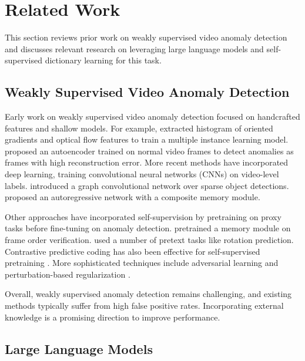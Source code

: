 \section{Related Work}
\label{sec:relate}

%
This section reviews prior work on weakly supervised video anomaly detection and discusses relevant research on leveraging large language models and self-supervised dictionary learning for this task.

\subsection{Weakly Supervised Video Anomaly Detection}

Early work on weakly supervised video anomaly detection focused on handcrafted features and shallow models. For example, \citet{a-lu2013abnormal} extracted histogram of oriented gradients and optical flow features to train a multiple instance learning model. \citet{a-chen2020unsupervised} proposed an autoencoder trained on normal video frames to detect anomalies as frames with high reconstruction error. More recent methods have incorporated deep learning, training convolutional neural networks (CNNs) on video-level labels. \citet{a-zhong2019graph} introduced a graph convolutional network over sparse object detections. \citet{a-nguyen2019anomaly} proposed an autoregressive network with a composite memory module.

Other approaches have incorporated self-supervision by pretraining on proxy tasks before fine-tuning on anomaly detection. \citet{a-gong2019memorizing} pretrained a memory module on frame order verification. \citet{a-park2020learning} used a number of pretext tasks like rotation prediction. Contrastive predictive coding has also been effective for self-supervised pretraining \citep{a-liu2021weakly}. More sophisticated techniques include adversarial learning \citep{a-jin2021adversarial} and perturbation-based regularization \citep{a-morais2019learning}.

%
Overall, weakly supervised anomaly detection remains challenging, and existing methods typically suffer from high false positive rates. Incorporating external knowledge is a promising direction to improve performance.

\subsection{Large Language Models}


